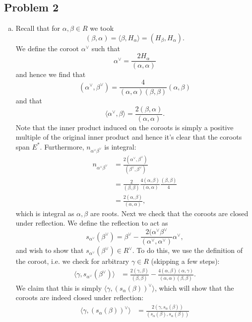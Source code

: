 \documentclass{../../mathnotes}
\begin{document}
\subsection*{Problem 2}

\begin{enumerate}[(a)]
    \item Recall that for $\alpha,\beta\in R$ we took
        \[(\beta,\alpha)=\langle\beta,H_\alpha\rangle=(H_\beta,H_\alpha).\]
        We define the coroot $\alpha^\vee$ such that
        \[\alpha^\vee=\frac{2H_\alpha}{(\alpha,\alpha)}\]
        and hence we find that
        \[(\alpha^\vee,\beta^\vee)=\frac{4}{(\alpha,\alpha)(\beta,\beta)}(\alpha,\beta)\]
        and that
        \[\langle \alpha^\vee,\beta\rangle=\frac{2(\beta,\alpha)}{(\alpha,\alpha)}.\]
        Note that the inner product induced on the coroots is simply a positive multiple of the original inner product
        and hence it's clear that the coroots span $E^*$. Furthermore, $n_{\alpha^\vee\beta^\vee}$ is integral:
        \begin{align*}
            n_{\alpha^\vee\beta^\vee}&=\frac{2(\alpha^\vee,\beta^\vee)}{(\beta^\vee,\beta^\vee)}\\
            &=\frac{2}{(\beta,\beta)}\frac{4(\alpha,\beta)}{(\alpha,\alpha)}\frac{(\beta,\beta)}{4}\\
            &=\frac{2(\alpha,\beta)}{(\alpha,\alpha)},
        \end{align*}
        which is integral as $\alpha,\beta$ are roots. Next we check that the coroots are closed under reflection.
        We define the reflection to act as
        \[s_{\alpha^\vee}(\beta^\vee)=\beta^\vee-\frac{2(\alpha^\vee\beta^\vee}{(\alpha^\vee,\alpha^\vee)}\alpha^\vee,\]
        and wish to show that $s_{\alpha^\vee}(\beta^{\vee})\in R^\vee$. To do this, we use the definition of the coroot,
        i.e. we check for arbitrary $\gamma\in R$ (skipping a few steps):
        \begin{align*}
            \langle \gamma,s_{\alpha^\vee}(\beta^\vee)\rangle&=\frac{2(\gamma,\beta)}{(\beta,\beta)}-\frac{4(\alpha,\beta)(\alpha,\gamma)}{(\alpha,\alpha)(\beta,\beta)}.
        \end{align*}
        We claim that this is simply $\langle\gamma,(s_\alpha(\beta))^\vee\rangle$, which will show that the coroots are indeed
        closed under reflection:
        \begin{align*}
            \langle \gamma,(s_\alpha(\beta))^\vee\rangle&=\frac{2(\gamma,s_\alpha(\beta))}{(s_\alpha(\beta),s_\alpha(\beta))}\\

\end{align*}
\end{enumerate}
\end{document}
